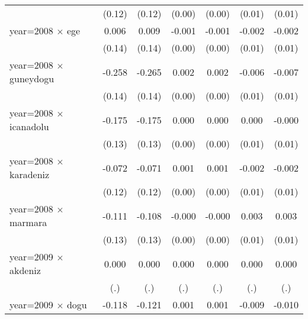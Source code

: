 {\begin{tabular}{l*{6}{c}}
                    &      (0.12)         &      (0.12)         &      (0.00)         &      (0.00)         &      (0.01)         &      (0.01)         \\
year=2008 $\times$ ege&       0.006         &       0.009         &      -0.001         &      -0.001         &      -0.002         &      -0.002         \\
                    &      (0.14)         &      (0.14)         &      (0.00)         &      (0.00)         &      (0.01)         &      (0.01)         \\
year=2008 $\times$ guneydogu&      -0.258         &      -0.265         &       0.002         &       0.002         &      -0.006         &      -0.007         \\
                    &      (0.14)         &      (0.14)         &      (0.00)         &      (0.00)         &      (0.01)         &      (0.01)         \\
year=2008 $\times$ icanadolu&      -0.175         &      -0.175         &       0.000         &       0.000         &       0.000         &      -0.000         \\
                    &      (0.13)         &      (0.13)         &      (0.00)         &      (0.00)         &      (0.01)         &      (0.01)         \\
year=2008 $\times$ karadeniz&      -0.072         &      -0.071         &       0.001         &       0.001         &      -0.002         &      -0.002         \\
                    &      (0.12)         &      (0.12)         &      (0.00)         &      (0.00)         &      (0.01)         &      (0.01)         \\
year=2008 $\times$ marmara&      -0.111         &      -0.108         &      -0.000         &      -0.000         &       0.003         &       0.003         \\
                    &      (0.13)         &      (0.13)         &      (0.00)         &      (0.00)         &      (0.01)         &      (0.01)         \\
year=2009 $\times$ akdeniz&       0.000         &       0.000         &       0.000         &       0.000         &       0.000         &       0.000         \\
                    &         (.)         &         (.)         &         (.)         &         (.)         &         (.)         &         (.)         \\
year=2009 $\times$ dogu&      -0.118         &      -0.121         &       0.001         &       0.001         &      -0.009         &      -0.010         \\

\end{tabular}}
